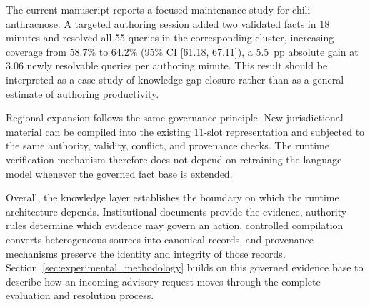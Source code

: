 \documentclass[a4paper,fleqn]{cas-dc}
\begin{document}
The current manuscript reports a focused maintenance study for chili anthracnose. A targeted authoring session added two validated facts in 18 minutes and resolved all 55 queries in the corresponding cluster, increasing coverage from 58.7\% to 64.2\% (95\% CI [61.18, 67.11]), a 5.5~pp absolute gain at 3.06 newly resolvable queries per authoring minute. This result should be interpreted as a case study of knowledge-gap closure rather than as a general estimate of authoring productivity.

Regional expansion follows the same governance principle. New jurisdictional material can be compiled into the existing 11-slot representation and subjected to the same authority, validity, conflict, and provenance checks. The runtime verification mechanism therefore does not depend on retraining the language model whenever the governed fact base is extended.

Overall, the knowledge layer establishes the boundary on which the runtime architecture depends. Institutional documents provide the evidence, authority rules determine which evidence may govern an action, controlled compilation converts heterogeneous sources into canonical records, and provenance mechanisms preserve the identity and integrity of those records. Section~\ref{sec:experimental_methodology} builds on this governed evidence base to describe how an incoming advisory request moves through the complete evaluation and resolution process.
\end{document}
